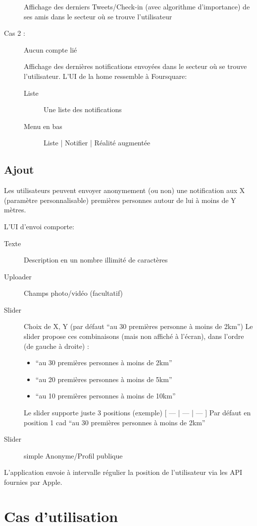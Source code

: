 \documentclass[a4paper,12pt]{report}
\begin{document}
\begin{onehalfspace}
\begin{description}
		Affichage des derniers Tweets/Check-in (avec algorithme d’importance) de ses amis dans le secteur où se trouve l’utilisateur

		\item[Cas 2 :] Aucun compte lié

		Affichage des dernières notifications envoyées dans le secteur où se trouve l’utilisateur.
		L’UI de la home ressemble à Foursquare:
			\begin{description}
			\item[Liste] Une liste des notifications
			\item[Menu en bas] Liste | Notifier | Réalité augmentée
			\end{description}
	\end{description}


	\section*{Ajout}
	Les utilisateurs peuvent envoyer anonymement (ou non) une notification aux X (paramètre personnalisable) premières personnes autour de lui à moins de Y mètres.

	L’UI d’envoi comporte:
		\begin{description}
		\item[Texte] Description en un nombre illimité de caractères
		\item[Uploader] Champs photo/vidéo (facultatif)
		\item[Slider] Choix de X, Y (par défaut “au 30 premières personne à moins de 2km”)
		Le slider propose ces combinaisons (mais non affiché à l’écran), dans l’ordre (de gauche à droite) :
			\begin{itemize}
			\item “au 30 premières personnes à moins de 2km”
			\item “au 20 premières personnes à moins de 5km”
			\item “au 10 premières personnes à moins de 10km”
			\end{itemize}
		Le slider supporte juste 3 positions (exemple) [ --- | --- | --- ]
		Par défaut en position 1 cad “au 30 premières personnes à moins de 2km”
		\item[Slider] simple Anonyme/Profil publique
		\end{description}

	L’application envoie à intervalle régulier la position de l’utilisateur via les API fournies par Apple.

	\chapter*{Cas d’utilisation}


\end{onehalfspace}
\end{document}

